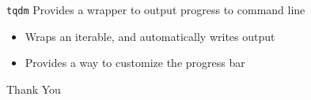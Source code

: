 \documentclass[12pt,t]{beamer}
\begin{document}
\begin{frame}{\texttt{tqdm}}
	Provides a wrapper to output progress to command line
	\begin{itemize}
		\item Wraps an iterable, and automatically writes output
		\item Provides a way to customize the progress bar
	\end{itemize}
\end{frame}

\begin{frame}[fragile, c]  %
	\begin{center}
		\Large{Thank You}
	\end{center}
\end{frame}
\end{document}
